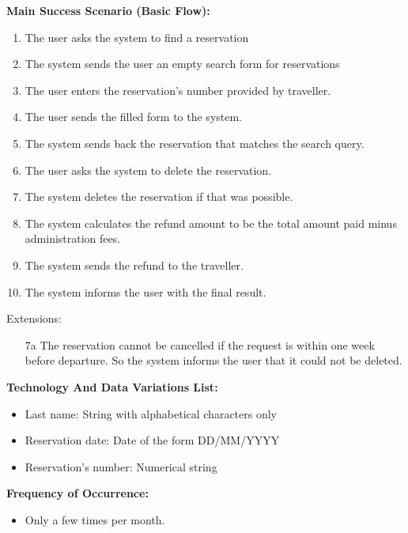 \textbf{Main Success Scenario (Basic Flow):}
\begin{enumerate}
\item The user asks the system to find a reservation
\item The system sends the user an empty search form for reservations
\item The user enters the reservation's number provided by traveller.
\item The user sends the filled form to the system.
\item The system sends back the reservation that matches the search query.
\item The user asks the system to delete the reservation.
\item The system deletes the reservation if that was possible.
\item The system calculates the refund amount to be the total amount paid minus administration fees.
\item The system sends the refund to the traveller.
\item The system informs the user with the final result.
\end{enumerate}
Extensions:
\begin{enumerate}
\item[7a] The reservation cannot be cancelled if the request is within one week before departure. So the system informs the user that it could not be deleted.
\end{enumerate}
\textbf{Technology And Data Variations List:} 
\begin{itemize}
    \item Last name: String with alphabetical characters only
    \item Reservation date: Date of the form DD/MM/YYYY
    \item Reservation's number: Numerical string
\end{itemize}
\textbf{Frequency of Occurrence:}
\begin{itemize}
    \item Only a few times per month.
\end{itemize}
